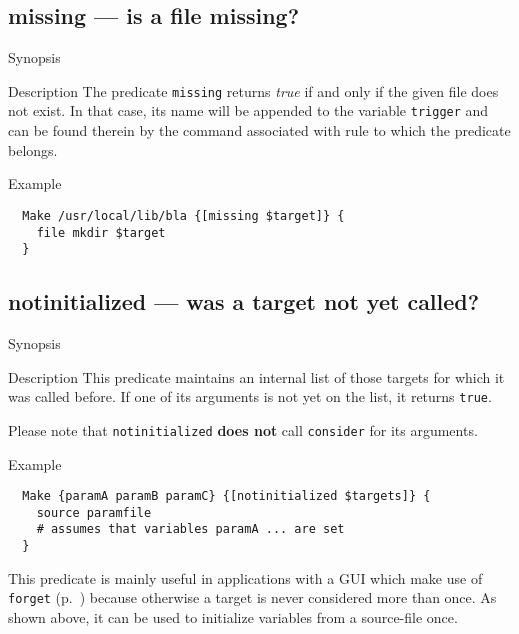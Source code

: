 \documentclass[11pt,bibtotoc,idxtotoc]{scrreprt}
\begin{document}
\subsection{missing --- is a file missing?}
\begin{Describe}
\item[Synopsis]  
\item[Description] The predicate \texttt{missing} returns
  \textit{true} if and only if the given file does not exist. In that
  case, its name will be appended to the variable \texttt{trigger} and
  can be found therein by the command associated with rule to which
  the predicate belongs.
\item[Example]
\begin{verbatim}
  Make /usr/local/lib/bla {[missing $target]} { 
    file mkdir $target
  }
\end{verbatim}
\end{Describe}

\subsection{notinitialized --- was a target not yet called?}
\label{pred:notinitialized}
\begin{Describe}
\item[Synopsis]  
\item[Description] This predicate maintains an internal list of those
  targets for which it was called before. If one of its arguments is
  not yet on the list, it returns \texttt{true}.
  
  Please note that \texttt{notinitialized} \textbf{does not} call
  \texttt{consider} for its arguments.
\item[Example]
\begin{verbatim}
  Make {paramA paramB paramC} {[notinitialized $targets]} {
    source paramfile    
    # assumes that variables paramA ... are set 
  }
\end{verbatim} 
  This predicate is mainly useful in applications with a GUI which
  make use of \texttt{forget} (p.~\pageref{proc:forget}) because
  otherwise a target is never considered more than once. As shown
  above, it can be used to initialize variables from a source-file once.
\end{Describe}
\end{document}
